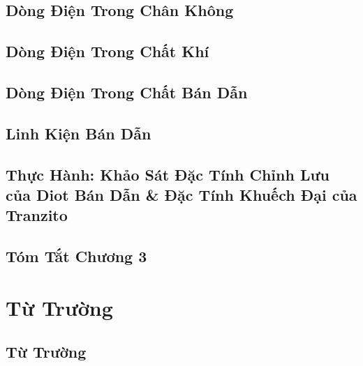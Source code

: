 \documentclass[oneside]{book}
\numberwithin{equation}{section}
\begin{document}
\section{Dòng Điện Trong Chân Không}


\section{Dòng Điện Trong Chất Khí}


\section{Dòng Điện Trong Chất Bán Dẫn}


\section{Linh Kiện Bán Dẫn}


\section{Thực Hành: Khảo Sát Đặc Tính Chỉnh Lưu của Diot Bán Dẫn \& Đặc Tính Khuếch Đại của Tranzito}


\section{Tóm Tắt Chương 3}


\chapter{Từ Trường}

\section{Từ Trường}
\end{document}
